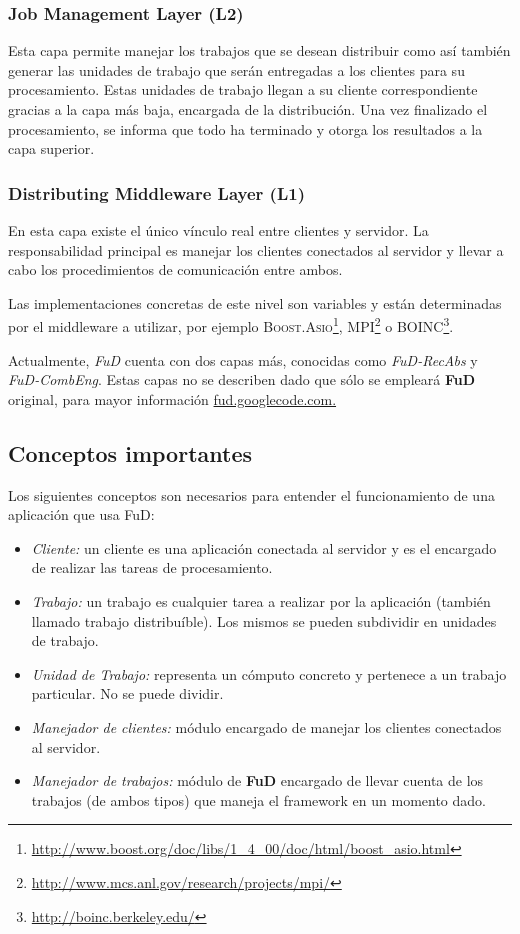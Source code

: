 \subsubsection{Job Management Layer (L2)} %
\par Esta capa permite manejar los trabajos que se desean distribuir como así también generar las unidades de
trabajo que serán entregadas a los clientes para su procesamiento. Estas unidades de trabajo llegan a su
cliente correspondiente gracias a la capa más baja, encargada de la distribución. Una vez finalizado el
procesamiento, se informa que todo ha terminado y otorga los resultados a la capa superior.

\subsubsection{Distributing Middleware Layer (L1)} %
\par En esta capa existe el único vínculo real entre clientes y servidor. La responsabilidad principal es manejar los clientes conectados al servidor y llevar a cabo los procedimientos de comunicación entre ambos.

\par Las implementaciones concretas de este nivel son variables y están determinadas por el middleware a
utilizar, por ejemplo \textsc{Boost.Asio}\footnote{\url{http://www.boost.org/doc/libs/1\_4\_00/doc/html/boost\_asio.html}}, \textsc{MPI}\footnote{\url{http://www.mcs.anl.gov/research/projects/mpi/}} o \textsc{BOINC}\footnote{\url{http://boinc.berkeley.edu/}}. 
		
\par Actualmente, \emph{FuD} cuenta con dos capas más, conocidas como \emph{FuD-RecAbs} y \emph{FuD-CombEng}. Estas capas no se describen dado que sólo se empleará \textbf{FuD} original, para mayor información \url{fud.googlecode.com.}

\subsection{Conceptos importantes}
Los siguientes conceptos son necesarios para entender el funcionamiento de una aplicación que usa FuD:
\begin{itemize}
	\item \emph{Cliente:} un cliente es una aplicación conectada al servidor y es el encargado de realizar las tareas de procesamiento.
	\item \emph{Trabajo:} un trabajo es cualquier tarea a realizar por la aplicación (también llamado trabajo distribuíble). Los mismos se
						  pueden subdividir en unidades de trabajo.
	\item \emph{Unidad de Trabajo:} representa un cómputo concreto y pertenece a un trabajo particular. No se puede dividir.
	\item \emph{Manejador de clientes:} módulo encargado de manejar los clientes conectados al servidor.
	\item \emph{Manejador de trabajos:} módulo de \textbf{FuD} encargado de llevar cuenta de los trabajos (de ambos tipos) que maneja el
										framework en un momento dado.
\end{itemize}
